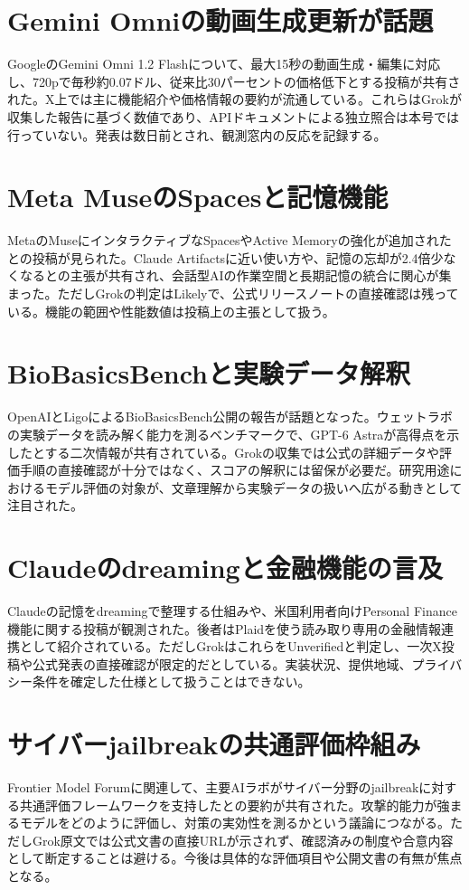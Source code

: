 \section{Gemini Omniの動画生成更新が話題}
GoogleのGemini Omni 1.2 Flashについて、最大15秒の動画生成・編集に対応し、720pで毎秒約0.07ドル、従来比30パーセントの価格低下とする投稿が共有された。X上では主に機能紹介や価格情報の要約が流通している。これらはGrokが収集した報告に基づく数値であり、APIドキュメントによる独立照合は本号では行っていない。発表は数日前とされ、観測窓内の反応を記録する。

\section{Meta MuseのSpacesと記憶機能}
MetaのMuseにインタラクティブなSpacesやActive Memoryの強化が追加されたとの投稿が見られた。Claude Artifactsに近い使い方や、記憶の忘却が2.4倍少なくなるとの主張が共有され、会話型AIの作業空間と長期記憶の統合に関心が集まった。ただしGrokの判定はLikelyで、公式リリースノートの直接確認は残っている。機能の範囲や性能数値は投稿上の主張として扱う。

\section{BioBasicsBenchと実験データ解釈}
OpenAIとLigoによるBioBasicsBench公開の報告が話題となった。ウェットラボの実験データを読み解く能力を測るベンチマークで、GPT-6 Astraが高得点を示したとする二次情報が共有されている。Grokの収集では公式の詳細データや評価手順の直接確認が十分ではなく、スコアの解釈には留保が必要だ。研究用途におけるモデル評価の対象が、文章理解から実験データの扱いへ広がる動きとして注目された。

\section{Claudeのdreamingと金融機能の言及}
Claudeの記憶をdreamingで整理する仕組みや、米国利用者向けPersonal Finance機能に関する投稿が観測された。後者はPlaidを使う読み取り専用の金融情報連携として紹介されている。ただしGrokはこれらをUnverifiedと判定し、一次X投稿や公式発表の直接確認が限定的だとしている。実装状況、提供地域、プライバシー条件を確定した仕様として扱うことはできない。

\section{サイバーjailbreakの共通評価枠組み}
Frontier Model Forumに関連して、主要AIラボがサイバー分野のjailbreakに対する共通評価フレームワークを支持したとの要約が共有された。攻撃的能力が強まるモデルをどのように評価し、対策の実効性を測るかという議論につながる。ただしGrok原文では公式文書の直接URLが示されず、確認済みの制度や合意内容として断定することは避ける。今後は具体的な評価項目や公開文書の有無が焦点となる。

